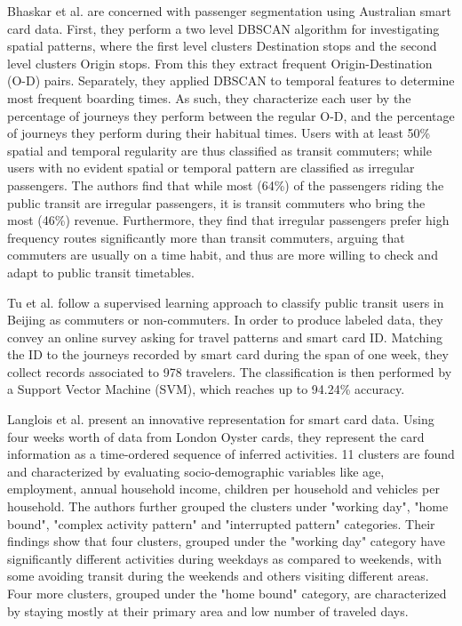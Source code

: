\documentclass{article}
\begin{document}

Bhaskar et al. are concerned with passenger segmentation using Australian smart card data. First, they perform a two level DBSCAN algorithm for investigating spatial patterns, where the first level clusters Destination stops and the second level clusters Origin stops.  From this they extract frequent Origin-Destination (O-D) pairs. Separately, they applied DBSCAN to temporal features to determine most frequent boarding times.  As such, they characterize each user by the percentage of journeys they perform between the regular O-D, and the percentage of journeys they perform during their habitual times. Users with at least 50\% spatial and temporal regularity are thus classified as transit commuters; while users with no evident spatial or temporal pattern are classified as irregular passengers. The authors find that while most (64\%) of the passengers riding the public transit are irregular passengers, it is transit commuters who bring the most (46\%) revenue. Furthermore, they find that irregular passengers prefer high frequency routes significantly more than transit commuters, arguing that commuters are usually on a time habit, and thus are more willing to check and adapt to public transit timetables. \cite{bhaskar2015passenger}

Tu et al. follow a supervised learning approach to classify public transit users in Beijing as commuters or non-commuters. In order to produce labeled data, they convey an online survey asking for travel patterns and smart card ID. Matching the ID to the journeys recorded by smart card during the span of one week, they collect records associated to 978 travelers. The classification is then performed by a Support Vector Machine (SVM), which reaches up to 94.24\% accuracy. \cite{tu2016impact}

Langlois et al. present an innovative representation for smart card data. Using four weeks worth of data from London Oyster cards, they represent the card information as a time-ordered sequence of inferred activities.  11 clusters are found and characterized by evaluating socio-demographic variables like age, employment, annual household income, children per household and vehicles per household. The authors further grouped the clusters under "working day", "home bound", "complex activity pattern" and "interrupted pattern" categories. Their findings show that four clusters, grouped under the "working day" category have significantly different activities during weekdays as compared to weekends, with some avoiding transit during the weekends and others visiting different areas.  Four more clusters, grouped under the "home bound" category, are characterized by staying mostly at their primary area and low number of traveled days. \cite{langlois2016inferring}
\end{document}
